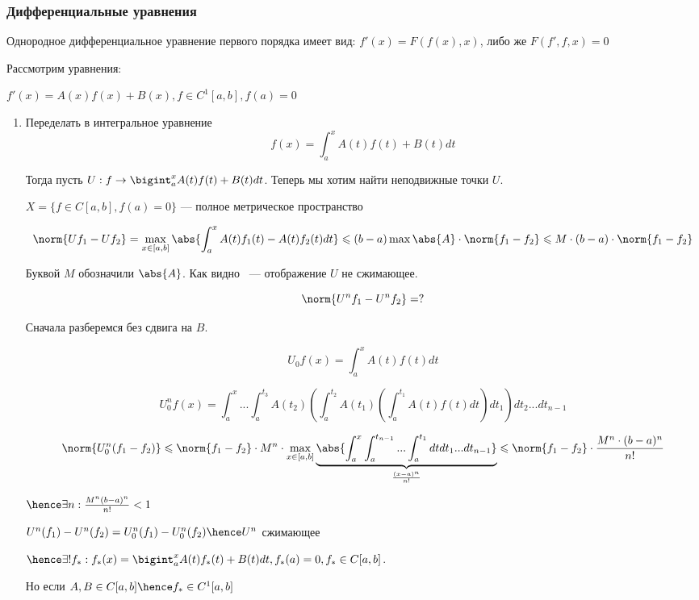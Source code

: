 \subsubsection*{Дифференциальные уравнения}

\begin{definition}
    Однородное дифференциальное уравнение первого порядка имеет вид: $f'(x) = F(f(x), x)$, либо же $F(f', f, x) = 0$
\end{definition}

Рассмотрим уравнения:

$f'(x) = A(x) f(x) + B(x), f \in C^1[a, b], f(a) = 0$

\begin{enumerate}
    \item Переделать в интегральное уравнение 
    \[
        f(x) = \int_a^x A(t)f(t)+B(t) dt
    \]

    Тогда пусть $U : f \to \bigint_a ^ x A(t) f(t) + B(t) dt$. Теперь мы хотим найти неподвижные точки $U$.

    $X = \{ f \in C[a, b] , f(a) = 0 \}$ --- полное метрическое пространство

    \[
        \norm{Uf_1 - Uf_2} = \max_{x \in [a, b]} \abs{\int_a^x A(t)f_1(t) - A(t) f_2(t) dt} \leqslant (b - a) \max \abs{A} \cdot \norm{f_1 - f_2} \leqslant M \cdot (b - a) \cdot \norm{f_1 - f_2}
    \]

    Буквой $M$ обозначили $\abs{A}$. Как видно ~--- отображение $U$ не сжимающее.

    \[
        \norm{U ^ n f_1 - U^n f_2} = ?
    \]

Сначала разберемся без сдвига на $B$.

    \[
        U_0 f(x) = \int_a ^ x A(t) f(t) dt
    \]

    \[
        U_0 ^ n f(x) =  \int_a^x  ... \int_a^{t_3} A(t_2) (\int_a^{t_2} A(t_1) (\int_a^{t_1} A(t) f(t) dt ) dt_1) dt_2 ... dt_{n - 1}
    \]

    \[
        \norm{U_0 ^ n (f_1 - f_2) } \leqslant \norm{f_1 - f_2} \cdot M ^ n \cdot \max_{x \in [a,b]} \underbrace{\abs{ \int_a^x \int_a^{t_{n - 1}} ... \int_a^{t_1} dt dt_1 ... dt_{n-1}}}_{\frac{(x - a) ^ n}{n !}} \leqslant \norm{f_1 - f_2} \cdot \frac{M ^ n \cdot (b - a) ^ n}{n !}
    \]

    $\hence \exists n : \frac{M ^ n (b - a)^n}{n !} < 1$

    $
        U ^ n (f_1) - U^n(f_2) = U_0 ^ n (f_1) - U_0 ^ n (f_2) \hence U ^ n
    $ сжимающее

    $\hence \exists! f_* : f_*(x) = \bigint_a^x A(t) f_*(t) + B(t) dt, f_*(a) = 0, f_* \in C[a, b]$.
    
    Но если $A, B \in C[a, b] \hence f_* \in C^1 [a, b]$
\end{enumerate}


